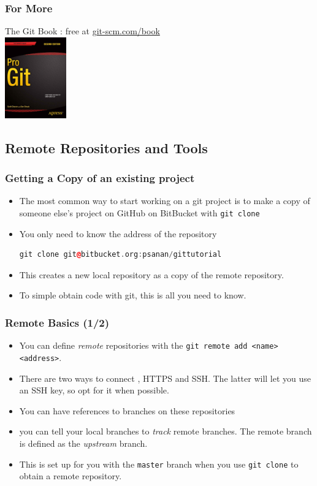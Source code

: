 \documentclass{beamer}
\begin{document}


\begin{frame}[fragile]
\frametitle{For More}
The Git Book : free at \href{https://git-scm.com/book}{git-scm.com/book} \\
\includegraphics[width=100px]{progit2}
\end{frame}

\subsection{Remote Repositories and Tools}

\begin{frame}[fragile]
\frametitle{Getting a Copy of an existing project}
\begin{itemize}
\item
The most common way to start working on a git project is to make a copy of someone else's project on GitHub on BitBucket with \lstinline{git clone}
\item You only need to know the address of the repository
\begin{lstlisting}[language=C++]
git clone git@bitbucket.org:psanan/gittutorial
\end{lstlisting}
\item This creates a new local repository as a copy of the remote repository.
\item To simple obtain code with git, this is all you need to know.
\end{itemize}
\end{frame}

\begin{frame}[fragile]
\frametitle{Remote Basics (1/2)}
\begin{itemize}
\item
You can define \emph{remote} repositories with the \lstinline{git remote add <name> <address>}.
\item There are two ways to connect , HTTPS and SSH. The latter will let you use an SSH key, so opt for it when possible.
\item You can have references to branches on these repositories
\item you can tell your local branches to \emph{track} remote branches. The remote branch is defined as the \emph{upstream} branch.
\item This is set up for you with the \lstinline{master} branch when you use \lstinline{git clone} to obtain a remote repository.
\end{itemize}
\end{frame}
\end{document}
